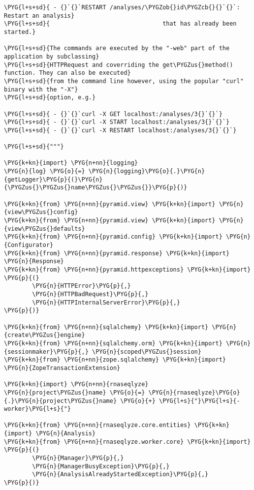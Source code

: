\begin{Verbatim}[commandchars=\\\{\}]
\PYG{l+s+sd}{ - {}`{}`RESTART /analyses/\PYGZob{}id\PYGZcb{}{}`{}`:  Restart an analysis}
\PYG{l+s+sd}{                                that has already been started.}

\PYG{l+s+sd}{The commands are executed by the "-web" part of the application by subclassing}
\PYG{l+s+sd}{HTTPRequest and coverriding the get\PYGZus{}method() function. They can also be executed}
\PYG{l+s+sd}{from the command line however, using the popular "curl" binary with the "-X"}
\PYG{l+s+sd}{option, e.g.}

\PYG{l+s+sd}{ - {}`{}`curl -X GET localhost:/analyses/3{}`{}`}
\PYG{l+s+sd}{ - {}`{}`curl -X START localhost:/analyses/3{}`{}`}
\PYG{l+s+sd}{ - {}`{}`curl -X RESTART localhost:/analyses/3{}`{}`}

\PYG{l+s+sd}{"""}

\PYG{k+kn}{import} \PYG{n+nn}{logging}
\PYG{n}{log} \PYG{o}{=} \PYG{n}{logging}\PYG{o}{.}\PYG{n}{getLogger}\PYG{p}{(}\PYG{n}{\PYGZus{}\PYGZus{}name\PYGZus{}\PYGZus{}}\PYG{p}{)}

\PYG{k+kn}{from} \PYG{n+nn}{pyramid.view} \PYG{k+kn}{import} \PYG{n}{view\PYGZus{}config}
\PYG{k+kn}{from} \PYG{n+nn}{pyramid.view} \PYG{k+kn}{import} \PYG{n}{view\PYGZus{}defaults}
\PYG{k+kn}{from} \PYG{n+nn}{pyramid.config} \PYG{k+kn}{import} \PYG{n}{Configurator}
\PYG{k+kn}{from} \PYG{n+nn}{pyramid.response} \PYG{k+kn}{import} \PYG{n}{Response}
\PYG{k+kn}{from} \PYG{n+nn}{pyramid.httpexceptions} \PYG{k+kn}{import} \PYG{p}{(}
        \PYG{n}{HTTPError}\PYG{p}{,}
        \PYG{n}{HTTPBadRequest}\PYG{p}{,}
        \PYG{n}{HTTPInternalServerError}\PYG{p}{,}
\PYG{p}{)}

\PYG{k+kn}{from} \PYG{n+nn}{sqlalchemy} \PYG{k+kn}{import} \PYG{n}{create\PYGZus{}engine}
\PYG{k+kn}{from} \PYG{n+nn}{sqlalchemy.orm} \PYG{k+kn}{import} \PYG{n}{sessionmaker}\PYG{p}{,} \PYG{n}{scoped\PYGZus{}session}
\PYG{k+kn}{from} \PYG{n+nn}{zope.sqlalchemy} \PYG{k+kn}{import} \PYG{n}{ZopeTransactionExtension}

\PYG{k+kn}{import} \PYG{n+nn}{rnaseqlyze}
\PYG{n}{project\PYGZus{}name} \PYG{o}{=} \PYG{n}{rnaseqlyze}\PYG{o}{.}\PYG{n}{project\PYGZus{}name} \PYG{o}{+} \PYG{l+s}{"}\PYG{l+s}{-worker}\PYG{l+s}{"}

\PYG{k+kn}{from} \PYG{n+nn}{rnaseqlyze.core.entities} \PYG{k+kn}{import} \PYG{n}{Analysis}
\PYG{k+kn}{from} \PYG{n+nn}{rnaseqlyze.worker.core} \PYG{k+kn}{import} \PYG{p}{(}
        \PYG{n}{Manager}\PYG{p}{,}
        \PYG{n}{ManagerBusyException}\PYG{p}{,}
        \PYG{n}{AnalysisAlreadyStartedException}\PYG{p}{,}
\PYG{p}{)}


\end{Verbatim}
